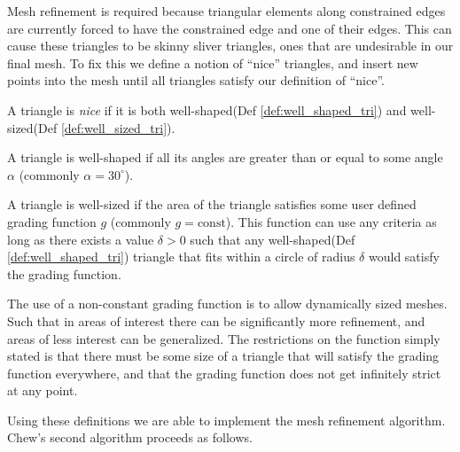 \documentclass[../fem.tex]{subfiles}
\begin{document}
Mesh refinement is required because triangular elements along constrained
edges are currently forced to have the constrained edge and one of their edges.
This can cause these triangles to be skinny sliver triangles, ones that are
undesirable in our final mesh. To fix this we define a notion of ``nice''
triangles, and insert new points into the mesh until all triangles satisfy
our definition of ``nice''.

\begin{definition} \label{def:nice_tri}
  A triangle is \textit{nice} if it is both well-shaped(Def
  \ref{def:well_shaped_tri}) and well-sized(Def \ref{def:well_sized_tri}).
\end{definition}

\begin{definition}\label{def:well_shaped_tri}
  A triangle is well-shaped if all its angles are greater than or equal to some
  angle $\alpha$ (commonly $\alpha=30^{\circ}$).
\end{definition}

\begin{definition}\label{def:well_sized_tri}
  A triangle is well-sized if the area of the triangle satisfies some user
  defined grading function $g$ (commonly $g=\text{const}$). This function can
  use any criteria as long as there exists a value $\delta > 0$ such that any
  well-shaped(Def \ref{def:well_shaped_tri}) triangle that fits within a circle
  of radius $\delta$ would satisfy the grading function.
\end{definition}

The use of a non-constant grading function is to allow dynamically sized
meshes.  Such that in areas of interest there can be significantly more
refinement, and areas of less interest can be generalized. The restrictions on
the function simply stated is that there must be some size of a triangle that
will satisfy the grading function everywhere, and that the grading function
does not get infinitely strict at any point.

Using these definitions we are able to implement the mesh refinement algorithm.
Chew's second algorithm proceeds as follows.
\end{document}
